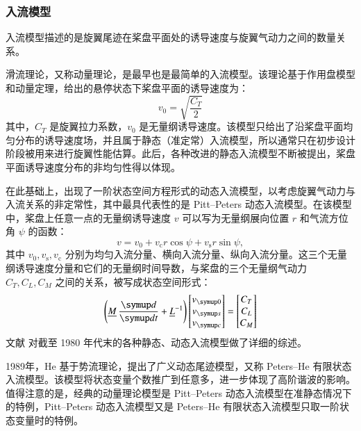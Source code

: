 \subsubsection{入流模型}

入流模型描述的是旋翼尾迹在桨盘平面处的诱导速度与旋翼气动力之间的数量关系。

滑流理论，又称动量理论，是最早也是最简单的入流模型。该理论基于作用盘模型和动量定理，给出的悬停状态下桨盘平面的诱导速度为：
\begin{equation}
v_{\mathrm{0}}=\sqrt{\frac{C_{T}}{2}}
\end{equation}
其中，$C_{T}$ 是旋翼拉力系数，$v_{\mathrm{0}}$ 是无量纲诱导速度。该模型只给出了沿桨盘平面均匀分布的诱导速度场，并且属于静态（准定常）入流模型，所以通常只在初步设计阶段被用来进行旋翼性能估算。此后，各种改进的静态入流模型不断被提出，桨盘平面诱导速度分布的非均匀性得以体现。

在此基础上，出现了一阶状态空间方程形式的动态入流模型，以考虑旋翼气动力与入流关系的非定常性，其中最具代表性的是 Pitt–Peters
动态入流模型。在该模型中，桨盘上任意一点的无量纲诱导速度 $v$ 可以写为无量纲展向位置 $r$ 和气流方位角 $\psi$
的函数：
\begin{equation}
v=v_{0}+v_{\mathrm{c}}r\cos\psi+v_{\mathrm{s}}r\sin\psi,
\end{equation}
其中 $v_{\mathrm{0}},v_{\mathrm{s}},v_{\mathrm{c}}$ 分别为均匀入流分量、横向入流分量、纵向入流分量。这三个无量纲诱导速度分量和它们的无量纲时间导数，与桨盘的三个无量纲气动力
$C_{T},C_{L},C_{M}$ 之间的关系，被写成状态空间形式：
\begin{equation}
\left(\underline{M}\,\dv{t}+\underline{L}^{-1}\right)\begin{bmatrix}v_{\mathrm{0}}\\
v_{\mathrm{s}}\\
v_{\mathrm{c}}
\end{bmatrix}=\begin{bmatrix}C_{T}\\
C_{L}\\
C_{M}
\end{bmatrix}
\end{equation}
文献 \cite{Chen1989} 对截至 1980 年代末的各种静态、动态入流模型做了详细的综述。

1989年，He 基于势流理论，提出了广义动态尾迹模型，又称 Peters–He
有限状态入流模型。该模型将状态变量个数推广到任意多，进一步体现了高阶谐波的影响。值得注意的是，经典的动量理论模型是 Pitt–Peters
动态入流模型在准静态情况下的特例，Pitt–Peters 动态入流模型又是 Peters–He 有限状态入流模型只取一阶状态变量时的特例。

